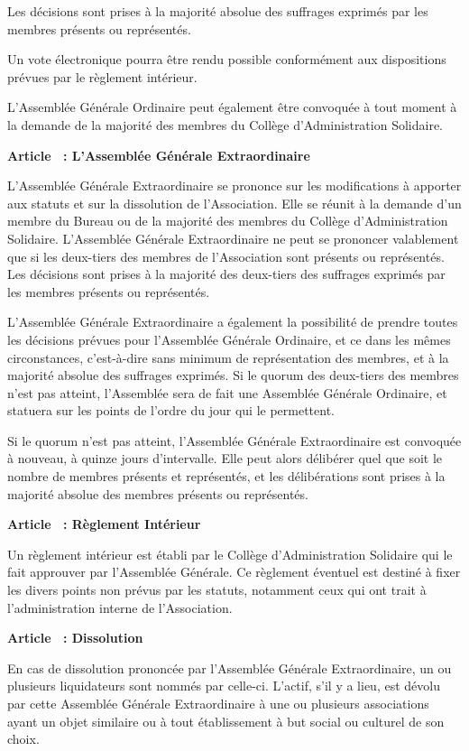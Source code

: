\documentclass [11pt]{article}
\renewcommand {\section}[1]{\stepcounter {section}%
{\vspace {1em}\noindent\Large \bf Article \thesection\ : #1 \par}}
\begin{document}
Les décisions sont prises à la majorité absolue des suffrages exprimés par
les membres présents ou représentés.

Un vote électronique pourra être rendu possible conformément aux dispositions
prévues par le règlement intérieur.

L'Assemblée Générale Ordinaire peut également être convoquée à tout moment
à la demande de la majorité des membres du Collège d'Administration Solidaire.


\section {L'Assemblée Générale Extraordinaire}

L'Assemblée Générale Extraordinaire se prononce sur les modifications à
apporter aux statuts et sur la dissolution de l'Association. Elle se
réunit à la demande d'un membre du Bureau ou de la majorité des membres
du Collège d'Administration Solidaire. L'Assemblée Générale Extraordinaire
ne peut se prononcer valablement que si les deux-tiers des membres de
l'Association sont présents ou représentés.
Les décisions sont prises à la majorité des deux-tiers des suffrages
exprimés par les membres présents ou représentés.

L'Assemblée Générale Extraordinaire a également la possibilité de prendre
toutes les décisions prévues pour l'Assemblée Générale Ordinaire, et ce
dans les mêmes circonstances, c'est-à-dire sans minimum de représentation
des membres, et à la majorité absolue des suffrages exprimés. Si le quorum
des deux-tiers des membres n'est pas atteint, l'Assemblée sera de fait
une Assemblée Générale Ordinaire, et statuera sur les points de l'ordre
du jour qui le permettent.

Si le quorum n'est pas atteint, l'Assemblée Générale Extraordinaire est
convoquée à nouveau, à quinze jours d'intervalle. Elle peut alors délibérer
quel que soit le nombre de membres présents et représentés, et les
délibérations sont prises à la majorité absolue des membres présents ou
représentés.


\section {Règlement Intérieur}

Un règlement intérieur est établi par le Collège d'Administration Solidaire
qui le fait approuver par l'Assemblée Générale. Ce règlement éventuel est
destiné à fixer les divers points non prévus par les statuts, notamment
ceux qui ont trait à l'administration interne de l'Association.


\section {Dissolution}

En cas de dissolution prononcée par l'Assemblée Générale Extraordinaire, un
ou plusieurs liquidateurs sont nommés par celle-ci. L'actif, s'il y a lieu,
est dévolu par cette Assemblée Générale Extraordinaire à une ou plusieurs
associations ayant un objet similaire ou à tout établissement à but social
ou culturel de son choix.
\end{document}
